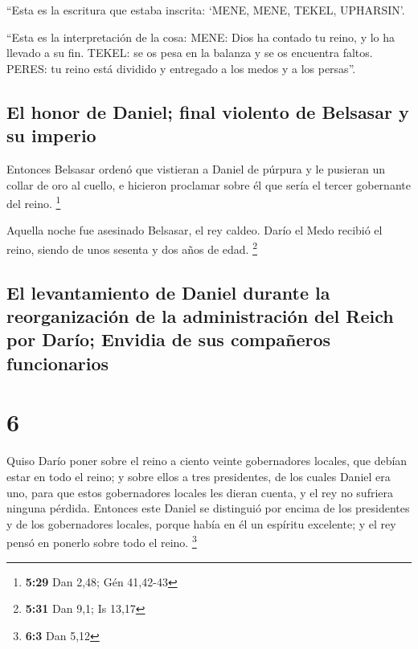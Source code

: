  ``Esta es la escritura que estaba inscrita: `MENE, MENE,
TEKEL, UPHARSIN'.

 ``Esta es la interpretación de la cosa: MENE: Dios ha
contado tu reino, y lo ha llevado a su fin.  TEKEL: se os
pesa en la balanza y se os encuentra faltos.  PERES: tu
reino está dividido y entregado a los medos y a los persas''.

\hypertarget{el-honor-de-daniel-final-violento-de-belsasar-y-su-imperio}{%
\subsection{El honor de Daniel; final violento de Belsasar y su
imperio}\label{el-honor-de-daniel-final-violento-de-belsasar-y-su-imperio}}

 Entonces Belsasar ordenó que vistieran a Daniel de
púrpura y le pusieran un collar de oro al cuello, e hicieron proclamar
sobre él que sería el tercer gobernante del reino. \footnote{\textbf{5:29}
  Dan 2,48; Gén 41,42-43}

 Aquella noche fue asesinado Belsasar, el rey caldeo.
 Darío el Medo recibió el reino, siendo de unos sesenta y
dos años de edad. \footnote{\textbf{5:31} Dan 9,1; Is 13,17}

\hypertarget{el-levantamiento-de-daniel-durante-la-reorganizaciuxf3n-de-la-administraciuxf3n-del-reich-por-daruxedo-envidia-de-sus-compauxf1eros-funcionarios}{%
\subsection{El levantamiento de Daniel durante la reorganización de la
administración del Reich por Darío; Envidia de sus compañeros
funcionarios}\label{el-levantamiento-de-daniel-durante-la-reorganizaciuxf3n-de-la-administraciuxf3n-del-reich-por-daruxedo-envidia-de-sus-compauxf1eros-funcionarios}}

\hypertarget{section-5}{%
\section{6}\label{section-5}}

 Quiso Darío poner sobre el reino a ciento veinte
gobernadores locales, que debían estar en todo el reino; 
y sobre ellos a tres presidentes, de los cuales Daniel era uno, para que
estos gobernadores locales les dieran cuenta, y el rey no sufriera
ninguna pérdida.  Entonces este Daniel se distinguió por
encima de los presidentes y de los gobernadores locales, porque había en
él un espíritu excelente; y el rey pensó en ponerlo sobre todo el reino.
\footnote{\textbf{6:3} Dan 5,12}

